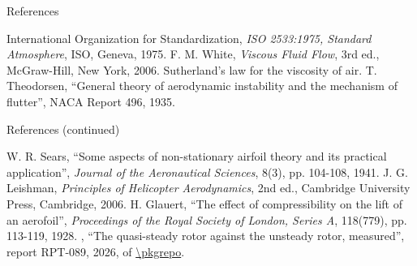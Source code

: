 \documentclass[aspectratio=169,11pt]{beamer}
\begin{document}








\begin{frame}{References}
\begin{reflist}
   
   
   \recordsref
   
   
   
   International Organization for Standardization, \emph{ISO
        2533:1975, Standard Atmosphere}, ISO, Geneva, 1975.
   F. M. White, \emph{Viscous Fluid Flow}, 3rd ed., McGraw-Hill, New
        York, 2006. Sutherland's law for the viscosity of air.
   \smiref
   T. Theodorsen, ``General theory of aerodynamic instability and the
        mechanism of flutter'', NACA Report 496, 1935.
\end{reflist}
\end{frame}

\begin{frame}{References (continued)}
\begin{reflist}
  \setcounter{enumi}{10}
   W. R. Sears, ``Some aspects of non-stationary airfoil theory and its
        practical application'', \emph{Journal of the Aeronautical Sciences},
        8(3), pp. 104-108, 1941.
   J. G. Leishman, \emph{Principles of Helicopter Aerodynamics}, 2nd
        ed., Cambridge University Press, Cambridge, 2006.
   H. Glauert, ``The effect of compressibility on the lift of an
        aerofoil'', \emph{Proceedings of the Royal Society of London, Series
        A}, 118(779), pp. 113-119, 1928.
   \pkgauthor, ``The quasi-steady rotor against the unsteady rotor,
        measured'', report RPT-089, 2026,  of \url{\pkgrepo}.
\end{reflist}
\end{frame}
\end{document}
